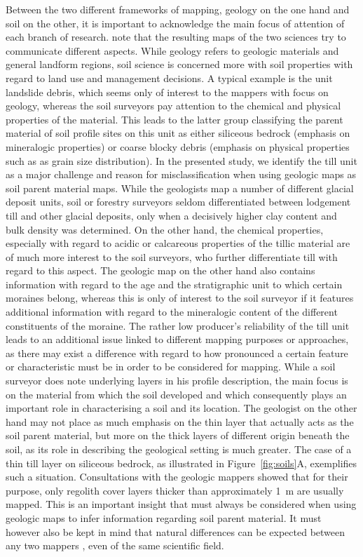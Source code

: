 \documentclass[preprint,12pt,authoryear]{elsarticle}
\begin{document}
Between the two different frameworks of mapping, geology on the one hand and soil on the other, it is important to acknowledge the main focus of attention of each branch of research. \cite{Miller2015a} note that the resulting maps of the two sciences try to communicate different aspects. While geology refers to geologic materials and general landform regions, soil science is concerned more with soil properties with regard to land use and management decisions. A typical example is the unit landslide debris, which seems only of interest to the mappers with focus on geology, whereas the soil surveyors pay attention to the chemical and physical properties of the material. This leads to the latter group classifying the parent material of soil profile sites on this unit as either siliceous bedrock (emphasis on mineralogic properties) or coarse blocky debris (emphasis on  physical properties such as as grain size distribution). In the presented study, we identify the till unit as a major challenge and reason for misclassification when using geologic maps as soil parent material maps. While the geologists map a number of different glacial deposit units, soil or forestry surveyors seldom differentiated between lodgement till and other glacial deposits, only when a decisively higher clay content and bulk density was determined. On the other hand, the chemical properties, especially with regard to acidic or calcareous properties of the tillic material are of much more interest to the soil surveyors, who further differentiate till with regard to this aspect. The geologic map on the other hand also contains information with regard to the age and the stratigraphic unit to which certain moraines belong, whereas this is only of interest to the soil surveyor if it features additional information with regard to the mineralogic content of the different constituents of the moraine. The rather low producer's reliability  of the till unit leads to an additional issue linked to different mapping purposes or approaches, as there may exist a difference with regard to how pronounced a certain feature or characteristic must be in order to be considered for mapping. While a soil surveyor does note underlying layers in his profile description, the main focus is on the material from which the soil developed and which consequently plays an important role in characterising a soil and its location. The geologist on the other hand may not place as much emphasis on the thin layer that actually acts as the soil parent material, but more on the thick layers of different origin beneath the soil, as its role in describing the geological setting is much greater. The case of a thin till layer on siliceous bedrock, as illustrated in Figure~\ref{fig:soils}A, exemplifies such a situation. Consultations with the geologic mappers showed that for their purpose, only regolith cover layers thicker than approximately 1~m are usually mapped. This is an important insight that must always be considered when using geologic maps to infer information regarding soil parent material. It must however also be kept in mind that natural differences can be expected between any two mappers \citep{Miller2015a}, even of the same scientific field. 
\end{document}
